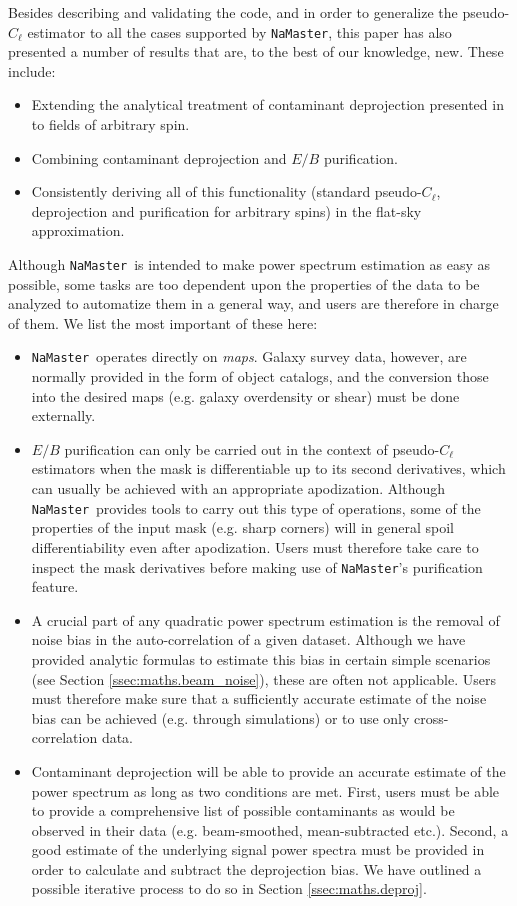 \documentclass[usenatbib]{mnrasb}
\newcommand{\nmt}{{\tt NaMaster}}
\begin{document}
    Besides describing and validating the code, and in order to generalize the pseudo-$C_\ell$ estimator to all the cases supported by \nmt, this paper has also presented a number of results that are, to the best of our knowledge, new. These include:
    \begin{itemize}
      \item Extending the analytical treatment of contaminant deprojection presented in \cite{2016MNRAS.456.2095E} to fields of arbitrary spin.
      \item Combining contaminant deprojection and $E/B$ purification.
      \item Consistently deriving all of this functionality (standard pseudo-$C_\ell$, deprojection and purification for arbitrary spins) in the flat-sky approximation.
    \end{itemize}
    
    Although \nmt~is intended to make power spectrum estimation as easy as possible, some tasks are too dependent upon the properties of the data to be analyzed to automatize them in a general way, and users are therefore in charge of them. We list the most important of these here:
    \begin{itemize}
      \item \nmt~operates directly on {\sl maps}. Galaxy survey data, however, are normally provided in the form of object catalogs, and the conversion those into the desired maps (e.g. galaxy overdensity or shear) must be done externally. 
      \item $E/B$ purification can only be carried out in the context of pseudo-$C_\ell$ estimators when the mask is differentiable up to its second derivatives, which can usually be achieved with an appropriate apodization. Although \nmt~provides tools to carry out this type of operations, some of the properties of the input mask (e.g. sharp corners) will in general spoil differentiability even after apodization. Users must therefore take care to inspect the mask derivatives before making use of \nmt's purification feature.
      \item A crucial part of any quadratic power spectrum estimation is the removal of noise bias in the auto-correlation of a given dataset. Although we have provided analytic formulas to estimate this bias in certain simple scenarios (see Section \ref{ssec:maths.beam_noise}), these are often not applicable. Users must therefore make sure that a sufficiently accurate estimate of the noise bias can be achieved (e.g. through simulations) or to use only cross-correlation data.
      \item Contaminant deprojection will be able to provide an accurate estimate of the power spectrum as long as two conditions are met. First, users must be able to provide a comprehensive list of possible contaminants as would be observed in their data (e.g. beam-smoothed, mean-subtracted etc.). Second, a good estimate of the underlying signal power spectra must be provided in order to calculate and subtract the deprojection bias. We have outlined a possible iterative process to do so in Section \ref{ssec:maths.deproj}.
    \end{itemize}
\end{document}
